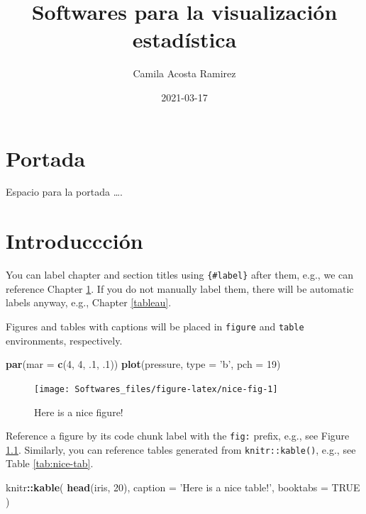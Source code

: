\documentclass[
]{book}
\title{Softwares para la visualización estadística}
\author{Camila Acosta Ramirez}
\date{2021-03-17}
\newenvironment{Shaded}{\begin{snugshade}}{\end{snugshade}}
\newcommand{\DataTypeTok}[1]{\textcolor[rgb]{0.13,0.29,0.53}{#1}}
\newcommand{\DecValTok}[1]{\textcolor[rgb]{0.00,0.00,0.81}{#1}}
\newcommand{\FloatTok}[1]{\textcolor[rgb]{0.00,0.00,0.81}{#1}}
\newcommand{\KeywordTok}[1]{\textcolor[rgb]{0.13,0.29,0.53}{\textbf{#1}}}
\newcommand{\NormalTok}[1]{#1}
\newcommand{\OperatorTok}[1]{\textcolor[rgb]{0.81,0.36,0.00}{\textbf{#1}}}
\newcommand{\OtherTok}[1]{\textcolor[rgb]{0.56,0.35,0.01}{#1}}
\newcommand{\StringTok}[1]{\textcolor[rgb]{0.31,0.60,0.02}{#1}}
\begin{document}
\maketitle

{
\setcounter{tocdepth}{1}
\tableofcontents
}
\hypertarget{portada}{%
\chapter*{Portada}\label{portada}}

Espacio para la portada \ldots.

\hypertarget{intro}{%
\chapter{Introduccción}\label{intro}}

You can label chapter and section titles using \texttt{\{\#label\}} after them, e.g., we can reference Chapter \ref{intro}. If you do not manually label them, there will be automatic labels anyway, e.g., Chapter \ref{tableau}.

Figures and tables with captions will be placed in \texttt{figure} and \texttt{table} environments, respectively.

\begin{Shaded}
\begin{Highlighting}[]
\KeywordTok{par}\NormalTok{(}\DataTypeTok{mar =} \KeywordTok{c}\NormalTok{(}\DecValTok{4}\NormalTok{, }\DecValTok{4}\NormalTok{, }\FloatTok{.1}\NormalTok{, }\FloatTok{.1}\NormalTok{))}
\KeywordTok{plot}\NormalTok{(pressure, }\DataTypeTok{type =} \StringTok{'b'}\NormalTok{, }\DataTypeTok{pch =} \DecValTok{19}\NormalTok{)}
\end{Highlighting}
\end{Shaded}

\begin{figure}

{\centering \texttt{[image: Softwares\_files/figure-latex/nice-fig-1]} 

}

\caption{Here is a nice figure!}\label{fig:nice-fig}
\end{figure}

Reference a figure by its code chunk label with the \texttt{fig:} prefix, e.g., see Figure \ref{fig:nice-fig}. Similarly, you can reference tables generated from \texttt{knitr::kable()}, e.g., see Table \ref{tab:nice-tab}.

\begin{Shaded}
\begin{Highlighting}[]
\NormalTok{knitr}\OperatorTok{::}\KeywordTok{kable}\NormalTok{(}
  \KeywordTok{head}\NormalTok{(iris, }\DecValTok{20}\NormalTok{), }\DataTypeTok{caption =} \StringTok{'Here is a nice table!'}\NormalTok{,}
  \DataTypeTok{booktabs =} \OtherTok{TRUE}
\NormalTok{)}
\end{Highlighting}
\end{Shaded}
\end{document}
